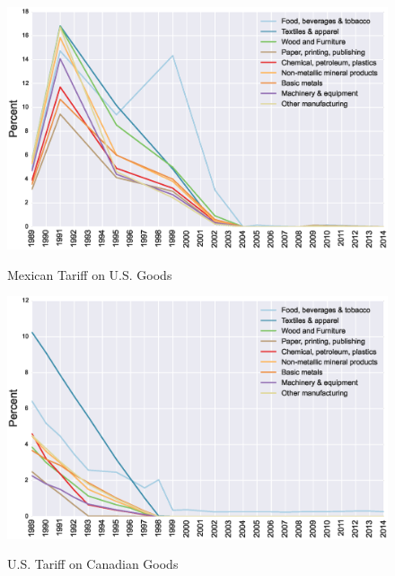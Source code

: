 \begin{figure}[htpb]\centering
\caption{\small Mexican Tariff on U.S. Goods}\vspace{0.2cm}
\includegraphics[scale=0.5]{tau_mex_usa}
\label{fig:mex_usa}
\end{figure}

\newpage

\begin{figure}[htpb]\centering
\caption{\small U.S. Tariff on Canadian Goods}\vspace{0.2cm}
\includegraphics[scale=0.5]{tau_usa_can}
\label{fig:usa_can}
\end{figure}
 
